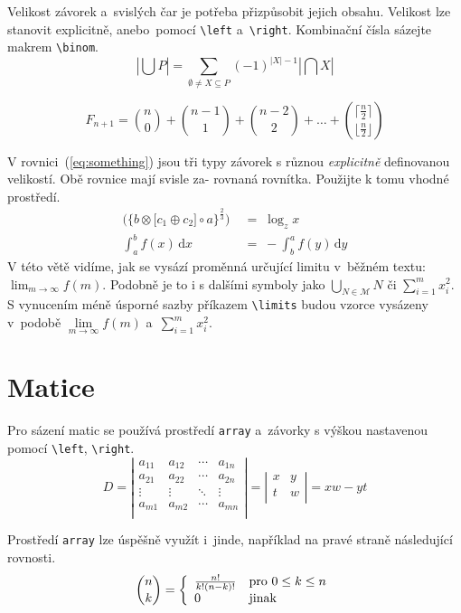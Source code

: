 \documentclass[twocolumn, a4paper, 11pt]{article}
\begin{document}
Velikost závorek a~svislých čar je potřeba přizpůsobit jejich obsahu. Velikost lze stanovit explicitně, anebo~pomocí \verb|\left| a~\verb|\right|. Kombinační čísla sázejte makrem \verb|\binom|.
$$ \left| \bigcup P \right| = \sum_{\emptyset \neq X \subseteq P}(-1)^{|X|-1} \left| \bigcap X \right|  $$

$$ F_{n+1}=\binom{n}{0} + \binom{n-1}{1} + \binom{n-2}{2}+\dots+
\binom{\lceil \frac{n}{2}\rceil}{\lfloor \frac{n}{2}\rfloor}$$

V rovnici~(\ref{eq:something}) jsou tři typy závorek s různou \emph{explicitně} definovanou velikostí. Obě rovnice mají svisle za- rovnaná rovnítka. Použijte k tomu vhodné prostředí.
\begin{align}
    \label{eq:something} \biggl( \Big\{ b \otimes \bigr[ c_1 \oplus c_2 \bigr] \circ a\Big\}^{\frac{2}{3}} \biggl)  \;&=\;\log_z x  
    \\ \label{eq:integ} \int^b_a f(x) \, \mathrm{d}x \;&=\; - \int^a_b f(y) \, \mathrm{d}y 
\end{align}
V této větě vidíme, jak se vysází proměnná určující
limitu v~běžném textu: $\lim_{m \to \infty} f(m)$. Podobně je to
i s dalšími symboly jako $\bigcup_{N \in \mathcal{M}}N$ či $\sum_{i=1}^{m} x^{2}_{i}$. S vynucením méně úsporné sazby příkazem \verb|\limits| budou vzorce vysázeny v~podobě $\lim\limits_{m \to \infty} f(m)$ a~$\sum\limits_{i=1}^{m} x^{2}_{i}$.

\section{Matice}
Pro sázení matic se používá prostředí \texttt{array} a~závorky s výškou nastavenou pomocí \verb|\left|, \verb|\right|.
$$D = \left| 
\begin{array}{cccc}
a_{11} & a_{12} & \cdots & a_{1n} \\
a_{21} & a_{22} & \cdots & a_{2n} \\
\vdots & \vdots & \ddots & \vdots \\
a_{m1} & a_{m2} & \cdots & a_{mn} \\
\end{array} 
\right| = \left| 
\begin{array}{cc}
x & y \\
t & w \\
\end{array}\right| = xw-yt$$

Prostředí \texttt{array} lze úspěšně využít i~jinde, například na pravé straně následující rovnosti.
$$ \binom{n}{k} = \left\{ \begin{array}{l l}
\frac{n!}{k!(n-k)!} & \text{pro } 0 \leq k \leq n\\
0 & \text{jinak}
\end{array} \right. $$
\end{document}
